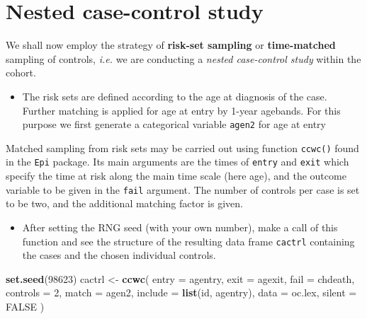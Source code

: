 \documentclass[
]{book}
\newenvironment{Shaded}{\begin{snugshade}}{\end{snugshade}}
\newcommand{\AttributeTok}[1]{\textcolor[rgb]{0.13,0.29,0.53}{#1}}
\newcommand{\ConstantTok}[1]{\textcolor[rgb]{0.56,0.35,0.01}{#1}}
\newcommand{\DecValTok}[1]{\textcolor[rgb]{0.00,0.00,0.81}{#1}}
\newcommand{\FunctionTok}[1]{\textcolor[rgb]{0.13,0.29,0.53}{\textbf{#1}}}
\newcommand{\NormalTok}[1]{#1}
\newcommand{\OtherTok}[1]{\textcolor[rgb]{0.56,0.35,0.01}{#1}}
\newcommand{\SpecialCharTok}[1]{\textcolor[rgb]{0.81,0.36,0.00}{\textbf{#1}}}
\providecommand{\tightlist}{%
  \setlength{\itemsep}{0pt}\setlength{\parskip}{0pt}}
\begin{document}
\section{Nested case-control study}\label{nested-case-control-study}

We shall now employ the strategy of \textbf{risk-set sampling}
or \textbf{time-matched} sampling of controls, \emph{i.e.}
we are conducting a \emph{nested case-control study}
within the cohort.

\begin{itemize}
\tightlist
\item
  The risk sets are defined according to the age at diagnosis of the case. Further matching is applied for age at entry by 1-year agebands.
  For this purpose we first generate a categorical variable
  \texttt{agen2} for age at entry
\end{itemize}

\begin{Shaded}
\end{Shaded}

Matched sampling from risk sets may be carried out using
function \texttt{ccwc()} found in the \texttt{Epi} package.
Its main arguments are the times
of \texttt{entry} and \texttt{exit} which specify the time at risk along the
main time scale (here age), and the outcome variable to be given
in the \texttt{fail} argument. The number of controls per case
is set to be two, and the additional matching factor is given.

\begin{itemize}
\tightlist
\item
  After setting the RNG seed (with your own number),
  make a call of this function and see
  the structure of the resulting data frame \texttt{cactrl}
  containing the cases and the chosen individual controls.
\end{itemize}

\begin{Shaded}
\begin{Highlighting}[]
\FunctionTok{set.seed}\NormalTok{(}\DecValTok{98623}\NormalTok{)}
\NormalTok{cactrl }\OtherTok{\textless{}{-}}
  \FunctionTok{ccwc}\NormalTok{(}
    \AttributeTok{entry =}\NormalTok{ agentry, }\AttributeTok{exit =}\NormalTok{ agexit, }\AttributeTok{fail =}\NormalTok{ chdeath,}
    \AttributeTok{controls =} \DecValTok{2}\NormalTok{, }\AttributeTok{match =}\NormalTok{ agen2,}
    \AttributeTok{include =} \FunctionTok{list}\NormalTok{(id, agentry),}
    \AttributeTok{data =}\NormalTok{ oc.lex, }\AttributeTok{silent =} \ConstantTok{FALSE}
\NormalTok{  )}
\end{Highlighting}
\end{Shaded}
\end{document}
